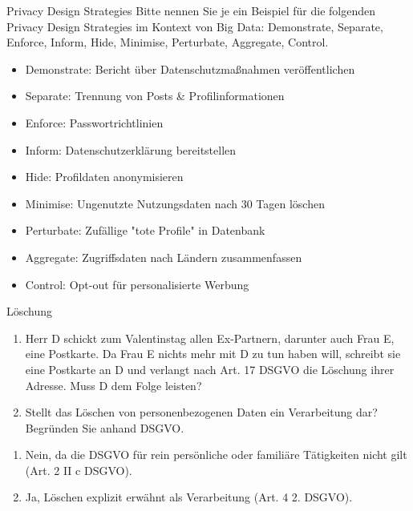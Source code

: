 \documentclass{article}
\begin{document}
\begin{exercise}{Privacy Design Strategies}
  Bitte nennen Sie je ein Beispiel für die folgenden Privacy Design Strategies im Kontext von Big Data: Demonstrate, Separate, Enforce, Inform, Hide, Minimise, Perturbate, Aggregate, Control.

  \begin{solution}
    \begin{itemize}
      \item Demonstrate: Bericht über Datenschutzmaßnahmen veröffentlichen
      \item Separate: Trennung von Posts \& Profilinformationen
      \item Enforce: Passwortrichtlinien
      \item Inform: Datenschutzerklärung bereitstellen
      \item Hide: Profildaten anonymisieren
      \item Minimise: Ungenutzte Nutzungsdaten nach 30 Tagen löschen
      \item Perturbate: Zufällige "tote Profile" in Datenbank
      \item Aggregate: Zugriffsdaten nach Ländern zusammenfassen
      \item Control: Opt-out für personalisierte Werbung
    \end{itemize}
  \end{solution}
\end{exercise}

\begin{exercise}{Löschung}
  \begin{enumerate}
    \item Herr D schickt zum Valentinstag allen Ex-Partnern, darunter auch Frau E, eine Postkarte. Da Frau E nichts mehr mit D zu tun haben will, schreibt sie eine Postkarte an D und verlangt nach Art. 17 DSGVO die Löschung ihrer Adresse. Muss D dem Folge leisten?
    \item Stellt das Löschen von personenbezogenen Daten ein Verarbeitung dar? Begründen Sie anhand DSGVO.
  \end{enumerate}

  \begin{solution}
    \begin{enumerate}
      \item Nein, da die DSGVO für rein persönliche oder familiäre Tätigkeiten nicht gilt (Art. 2 II c DSGVO).
      \item Ja, Löschen explizit erwähnt als Verarbeitung (Art. 4 2. DSGVO).
    \end{enumerate}
  \end{solution}
\end{exercise}
\end{document}
